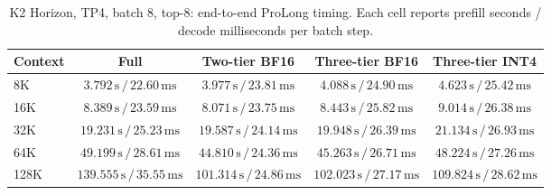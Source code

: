 \begin{table}[t]
\centering
\small
\caption{K2 Horizon, TP4, batch 8, top-8: end-to-end ProLong timing. Each cell reports prefill seconds / decode milliseconds per batch step.}
\label{tab:prolong-k2-horizon-tp4-b8-end-to-end}
\begin{tabular}{lcccc}
\toprule
Context & Full & Two-tier BF16 & Three-tier BF16 & Three-tier INT4 \\
\midrule
8K & \(3.792\,\mathrm{s}\,/\,22.60\,\mathrm{ms}\) & \(3.977\,\mathrm{s}\,/\,23.81\,\mathrm{ms}\) & \(4.088\,\mathrm{s}\,/\,24.90\,\mathrm{ms}\) & \(4.623\,\mathrm{s}\,/\,25.42\,\mathrm{ms}\) \\
16K & \(8.389\,\mathrm{s}\,/\,23.59\,\mathrm{ms}\) & \(8.071\,\mathrm{s}\,/\,23.75\,\mathrm{ms}\) & \(8.443\,\mathrm{s}\,/\,25.82\,\mathrm{ms}\) & \(9.014\,\mathrm{s}\,/\,26.38\,\mathrm{ms}\) \\
32K & \(19.231\,\mathrm{s}\,/\,25.23\,\mathrm{ms}\) & \(19.587\,\mathrm{s}\,/\,24.14\,\mathrm{ms}\) & \(19.948\,\mathrm{s}\,/\,26.39\,\mathrm{ms}\) & \(21.134\,\mathrm{s}\,/\,26.93\,\mathrm{ms}\) \\
64K & \(49.199\,\mathrm{s}\,/\,28.61\,\mathrm{ms}\) & \(44.810\,\mathrm{s}\,/\,24.36\,\mathrm{ms}\) & \(45.263\,\mathrm{s}\,/\,26.71\,\mathrm{ms}\) & \(48.224\,\mathrm{s}\,/\,27.26\,\mathrm{ms}\) \\
128K & \(139.555\,\mathrm{s}\,/\,35.55\,\mathrm{ms}\) & \(101.314\,\mathrm{s}\,/\,24.86\,\mathrm{ms}\) & \(102.023\,\mathrm{s}\,/\,27.17\,\mathrm{ms}\) & \(109.824\,\mathrm{s}\,/\,28.62\,\mathrm{ms}\) \\
\bottomrule
\end{tabular}
\end{table}

